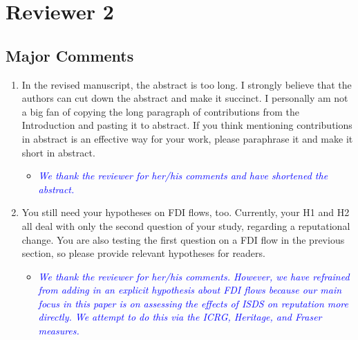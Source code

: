 \section{Reviewer 2}

\subsection{Major Comments}

\begin{enumerate}
	\item In the revised manuscript, the abstract is too long. I strongly believe that the authors can cut down the abstract and make it succinct. I personally am not a big fan of copying the long paragraph of contributions from the Introduction and pasting it to abstract. If you think mentioning contributions in abstract is an effective way for your work, please paraphrase it and make it short in abstract. 
	\begin{itemize}
		\item \textcolor{blue}{ \emph{ 
		We thank the reviewer for her/his comments and have shortened the abstract.
		}}
	\end{itemize}
	\item You still need your hypotheses on FDI flows, too. Currently, your H1 and H2 all deal with only the second question of your study, regarding a reputational change. You are also testing the first question on a FDI flow in the previous section, so please provide relevant hypotheses for readers. 
	\begin{itemize}
		\item \textcolor{blue}{ \emph{ 
		We thank the reviewer for her/his comments. However, we have refrained from adding in an explicit hypothesis about FDI flows because our main focus in this paper is on assessing the effects of ISDS on reputation more directly. We attempt to do this via the ICRG, Heritage, and Fraser measures. 
		}}	
	\end{itemize}
\end{enumerate}